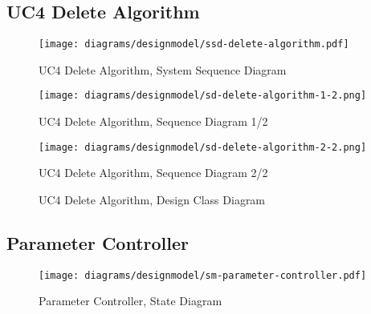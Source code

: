 \subsection{UC4 Delete Algorithm}
\begin{figure}[H]
    \centering
    \texttt{[image: diagrams/designmodel/ssd-delete-algorithm.pdf]}
    \caption{UC4 Delete Algorithm, System Sequence Diagram}
    \label{fig:delete-algorithm-ssd}
\end{figure}
\begin{figure}[p]%
  \begin{leftfullpage}
    \texttt{[image: diagrams/designmodel/sd-delete-algorithm-1-2.png]}
    \caption{UC4 Delete Algorithm, Sequence Diagram 1/2}
    \label{fig:delete-algorithm-sd-1}
  \end{leftfullpage}
\end{figure}
\begin{figure}[p]%
  \begin{fullpage}
    \texttt{[image: diagrams/designmodel/sd-delete-algorithm-2-2.png]}
    \caption{UC4 Delete Algorithm, Sequence Diagram 2/2}
    \label{fig:delete-algorithm-sd-2}
  \end{fullpage}
\end{figure}
\begin{figure}[H]
    \centering
    \caption{UC4 Delete Algorithm, Design Class Diagram}
    \label{fig:delete-algorithm-dcd}
\end{figure}
\newpage
% 
\subsection{Parameter Controller}
\begin{figure}[H]
    \centering
    \texttt{[image: diagrams/designmodel/sm-parameter-controller.pdf]}
    \caption{Parameter Controller, State Diagram}
    \label{fig:parameter-controller-sm}
\end{figure}
% 
